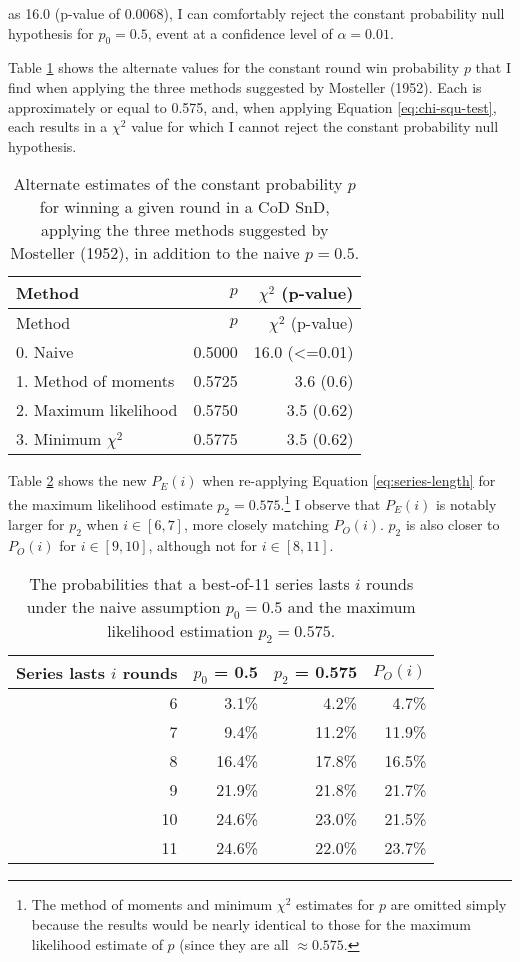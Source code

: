 \documentclass{article}
\begin{document}
as 16.0 (p-value of 0.0068), I can comfortably reject the constant
probability null hypothesis for \(p_0 = 0.5\), event at a confidence
level of \(\alpha = 0.01\).

Table \ref{tbl:mosteller-methods-results} shows the alternate values for
the constant round win probability \(p\) that I find when applying the
three methods suggested by Mosteller (1952). Each is approximately or
equal to 0.575, and, when applying Equation \ref{eq:chi-squ-test}, each
results in a \(\chi^2\) value for which I cannot reject the constant
probability null hypothesis.

\begin{longtable}[]{@{}lrr@{}}
  \caption{Alternate estimates of the constant probability \(p\) for winning a given round in a CoD SnD, applying the three methods suggested by Mosteller (1952), in addition to the naive \(p = 0.5\).}\label{tbl:mosteller-methods-results} \\
  \toprule()
    Method & \(p\) & \(\chi^2\) (p-value) \\
    \midrule()
    \endfirsthead
    \toprule()
    Method & \(p\) & \(\chi^2\) (p-value) \\
    \midrule()
  \endhead
  0. Naive & 0.5000 & 16.0 (\textless=0.01) \\
  1. Method of moments & 0.5725 & 3.6 (0.6) \\
  2. Maximum likelihood & 0.5750 & 3.5 (0.62) \\
  3. Minimum \(\chi^2\) & 0.5775 & 3.5 (0.62) \\
  \bottomrule()
\end{longtable}

Table \ref{tbl:expected-series-lengths-alternative-ps} shows the new
\(P_E(i)\) when re-applying Equation \ref{eq:series-length} for the
maximum likelihood estimate \(p_2 = 0.575\).\footnote{The method of
  moments and minimum \(\chi^2\) estimates for \(p\) are omitted simply
  because the results would be nearly identical to those for the maximum
  likelihood estimate of \(p\) (since they are all \(\approx 0.575\).} I
observe that \(P_E(i)\) is notably larger for \(p_{2}\) when
\(i \in [6, 7]\), more closely matching \(P_O(i)\). \(p_{2}\) is also
closer to \(P_O(i)\) for \(i \in [9, 10]\), although not for
\(i \in [8, 11]\).

\begin{longtable}[]{@{}rrrr@{}}
\caption{The probabilities that a best-of-11 series lasts $i$ rounds under the naive assumption $p_0 = 0.5$ and the maximum likelihood estimation $p_2 = 0.575$.}\label{tbl:expected-series-lengths-alternative-ps} \\
\toprule()
Series lasts \(i\) rounds & \(p_0\) = 0.5 & \(p_2\) = 0.575 & \(P_O(i)\) \\
\midrule()
\endhead
6 & 3.1\% & 4.2\% & 4.7\% \\
7 & 9.4\% & 11.2\% & 11.9\% \\
8 & 16.4\% & 17.8\% & 16.5\% \\
9 & 21.9\% & 21.8\% & 21.7\% \\
10 & 24.6\% & 23.0\% & 21.5\% \\
11 & 24.6\% & 22.0\% & 23.7\% \\
\bottomrule()
\end{longtable}
\end{document}
